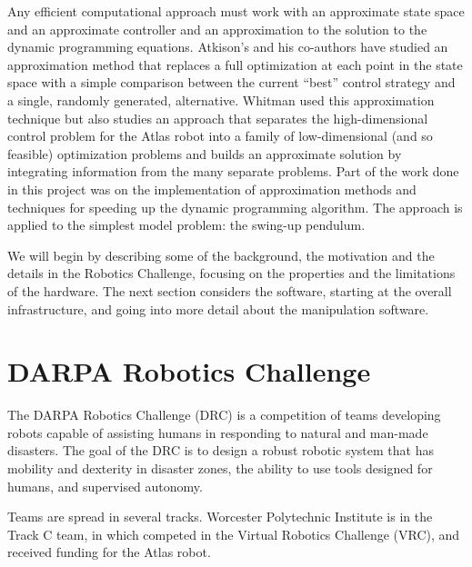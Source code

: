 \documentclass[12pt]{report}
\begin{document}
Any efficient computational approach must work with an approximate state space and an approximate controller and an approximation to the solution to the dynamic programming equations.  Atkison's \cite{random_sampling_dynamic_programming} and his co-authors have studied an approximation method that replaces a full optimization at each point in the state space with a simple comparison between the current “best” control strategy and a single, randomly generated, alternative.  Whitman \cite{eric_thesis} used this approximation technique but also studies an approach that separates the high-dimensional control problem for the Atlas robot into a family of low-dimensional (and so feasible) optimization problems and builds an approximate solution by integrating information from the many separate problems.  
Part of the work done in this project was on the implementation of approximation methods and techniques for speeding up the dynamic programming algorithm.  The approach is applied to the simplest model problem: the swing-up pendulum. \cite{eric_thesis} 

We will begin by describing some of the background, the motivation and the details in the Robotics Challenge, focusing on the properties and the limitations of the hardware.  The next section considers the software, starting at the overall infrastructure, and going into more detail about the manipulation software. 


\chapter{DARPA Robotics Challenge}
 
The DARPA Robotics Challenge (DRC) is a competition of teams developing robots capable of assisting humans in responding to natural and man-made disasters. The goal of the DRC is to design a robust robotic system that has mobility and dexterity in disaster zones, the ability to use tools designed for humans, and supervised autonomy.
 
Teams are spread in several tracks. Worcester Polytechnic Institute is in the Track C team, in which competed in the Virtual Robotics Challenge (VRC), and received funding for the Atlas robot.  
\end{document}
